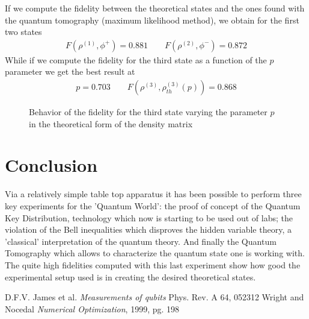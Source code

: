 \documentclass[a4paper, 11pt]{article}
\begin{document}
        If we compute the fidelity between the theoretical states and the ones found with the quantum tomography (maximum likelihood method), we obtain for the first two states
        \begin{gather*}
          F(\rho^{(1)},\phi^+) = 0.881 \qquad   F(\rho^{(2)},\phi^-) = 0.872
        \end{gather*}
        While if we compute the fidelity for the third state as a function of the $p$ parameter we get the best result at
        \begin{gather*}
          p = 0.703 \qquad F(\rho^{(3)},\rho^{(3)}_{th}(p)) = 0.868
        \end{gather*}

        \begin{figure}[H]
          \centering
          \caption{Behavior of the fidelity for the third state varying the parameter $p$ in the theoretical form of the density matrix}
          \label{fig:decoherence_fidelity}
        \end{figure}



  \section{Conclusion}
    Via a relatively simple table top apparatus it has been possible to perform three key experiments for the 'Quantum World': the proof of concept of the Quantum Key Distribution, technology which now is starting to be used out of labs; the violation of the Bell inequalities which disproves the hidden variable theory, a 'classical' interpretation of the quantum theory. And finally the Quantum Tomography which allows to characterize the quantum state one is working with. The quite high fidelities computed with this last experiment show how good the experimental setup used is in creating the desired theoretical states.



  \begin{thebibliography}{100}
     D.F.V. James et al. \emph{Measurements of qubits} Phys. Rev. A 64, 052312
     Wright and Nocedal \emph{Numerical Optimization}, 1999, pg. 198
  \end{thebibliography}
\end{document}
